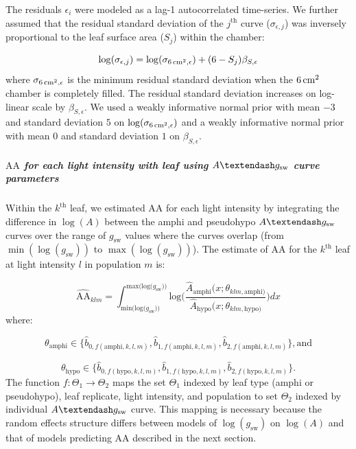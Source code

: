 \documentclass[
  letterpaper,
  DIV=11,
  numbers=noendperiod]{scrartcl}
\let\oldsubparagraph\subparagraph
\renewcommand{\subparagraph}[1]{\oldsubparagraph{#1}\mbox{}}
\newcommand{\aax}{$\mathrm{AA}$}
\newcommand{\agcurve}{$A \textendash g_\text{sw}$}
\newcommand{\gsw}{$g_\text{sw}$}
\newcommand{\loggsw}{$\log(g_\text{sw})$}
\newcommand{\logA}{$\log(A)$}
\begin{document}
The residuals \(\epsilon_{i}\) were modeled as a lag-1 autocorrelated
time-series. We further assumed that the residual standard deviation of
the \(j^{\text{th}}\) curve (\(\sigma_{\epsilon,j}\)) was inversely
proportional to the leaf surface area (\(S_j\)) within the chamber:

\[\log (\sigma_{\epsilon,j}) = \log (\sigma_{\qty{6}{\raiseto{2}\centi\meter},\epsilon}) + (6 - S_j) \beta_{S,\epsilon}\]
where \(\sigma_{\qty{6}{\raiseto{2}\centi\meter},\epsilon}\) is the
minimum residual standard deviation when the
\(\qty{6}{\raiseto{2}\centi\meter}\) chamber is completely filled. The
residual standard deviation increases on log-linear scale by
\(\beta_{S,\epsilon}\). We used a weakly informative normal prior with
mean \(-3\) and standard deviation \(5\) on
\(\log (\sigma_{\qty{6}{\raiseto{2}\centi\meter},\epsilon})\) and a
weakly informative normal prior with mean \(0\) and standard deviation
\(1\) on \(\beta_{S,\epsilon}\).

\subparagraph{\texorpdfstring{\aax{} for each light intensity with leaf
using \agcurve{} curve
parameters}{ for each light intensity with leaf using  curve parameters}}\label{for-each-light-intensity-with-leaf-using-curve-parameters}

Within the \(k^{\text{th}}\) leaf, we estimated \aax{} for each light
intensity by integrating the difference in \logA{} between the amphi and
pseudohypo \agcurve{} curves over the range of \gsw{} values where the
curves overlap (from \(\min(\log(g_\text{sw}))\) to
\(\max(\log(g_\text{sw}))\)). The estimate of \aax{} for the
\(k^{\text{th}}\) leaf at light intensity \(l\) in population \(m\) is:

\[\widehat{\mathrm{AA}}_{klm} = \int_{\text{min(log(}g_\text{sw}))}^{\text{max(log(}g_\text{sw}))} \text{log}\bigg(\frac{\hat{A}_\text{amphi}(x; \theta_{klm,\text{amphi})}}{\hat{A}_\text{hypo}(x; \theta_{klm,\text{hypo})}}\bigg) dx\]
where:

\[\theta_\text{amphi} \in \{\hat{b}_{0, f(\text{amphi}, k,l,m)}, \hat{b}_{1, f(\text{amphi}, k,l,m)}, \hat{b}_{2, f(\text{amphi}, k,l,m)}\}, \text{and}\]

\[\theta_\text{hypo} \in \{\hat{b}_{0, f(\text{hypo}, k,l,m)}, \hat{b}_{1, f(\text{hypo}, k,l,m)}, \hat{b}_{2, f(\text{hypo}, k,l,m)}\}.\]
The function \(f : \Theta_1 \rightarrow \Theta_2\) maps the set
\(\Theta_1\) indexed by leaf type (amphi or pseudohypo), leaf replicate,
light intensity, and population to set \(\Theta_2\) indexed by
individual \agcurve{} curve. This mapping is necessary because the
random effects structure differs between models of \loggsw{} on \logA{}
and that of models predicting \aax{} described in the next section.
\end{document}
